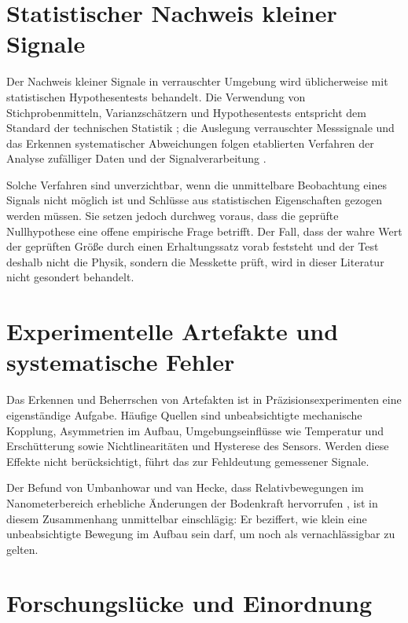 \documentclass[12pt,a4paper]{report}
\begin{document}
\section{Statistischer Nachweis kleiner Signale}

Der Nachweis kleiner Signale in verrauschter Umgebung wird üblicherweise
mit statistischen Hypothesentests behandelt. Die Verwendung von
Stichprobenmitteln, Varianzschätzern und Hypothesentests entspricht dem
Standard der technischen Statistik \cite{montgomery2014}; die Auslegung
verrauschter Messsignale und das Erkennen systematischer Abweichungen
folgen etablierten Verfahren der Analyse zufälliger Daten und der
Signalverarbeitung \cite{bendat2010, kay1998}.

Solche Verfahren sind unverzichtbar, wenn die unmittelbare Beobachtung
eines Signals nicht möglich ist und Schlüsse aus statistischen
Eigenschaften gezogen werden müssen. Sie setzen jedoch durchweg voraus,
dass die geprüfte Nullhypothese eine offene empirische Frage betrifft.
Der Fall, dass der wahre Wert der geprüften Größe durch einen
Erhaltungssatz vorab feststeht und der Test deshalb nicht die Physik,
sondern die Messkette prüft, wird in dieser Literatur nicht gesondert
behandelt.

\section{Experimentelle Artefakte und systematische Fehler}

Das Erkennen und Beherrschen von Artefakten ist in Präzisionsexperimenten
eine eigenständige Aufgabe. Häufige Quellen sind unbeabsichtigte
mechanische Kopplung, Asymmetrien im Aufbau, Umgebungseinflüsse wie
Temperatur und Erschütterung sowie Nichtlinearitäten und Hysterese des
Sensors. Werden diese Effekte nicht berücksichtigt, führt das zur
Fehldeutung gemessener Signale.

Der Befund von Umbanhowar und van Hecke, dass Relativbewegungen im
Nanometerbereich erhebliche Änderungen der Bodenkraft hervorrufen
\cite{umbanhowar2005}, ist in diesem Zusammenhang unmittelbar
einschlägig: Er beziffert, wie klein eine unbeabsichtigte Bewegung im
Aufbau sein darf, um noch als vernachlässigbar zu gelten.

\section{Forschungslücke und Einordnung}
\end{document}
